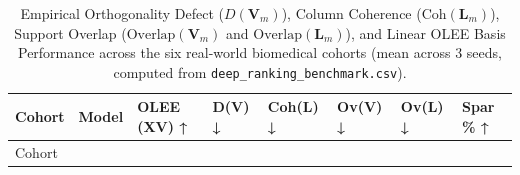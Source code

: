 \documentclass[
  10pt,
  letterpaper,
]{report}
\begin{document}
\begin{longtable}[]{@{}
  >{\raggedright\arraybackslash}p{}
  >{\raggedright\arraybackslash}p{}
  >{\raggedleft\arraybackslash}p{}
  >{\raggedleft\arraybackslash}p{}
  >{\raggedleft\arraybackslash}p{}
  >{\raggedleft\arraybackslash}p{}
  >{\raggedleft\arraybackslash}p{}
  >{\raggedleft\arraybackslash}p{}@{}}
\caption{Empirical Orthogonality Defect (\(D(\mathbf{V}_m)\)), Column
Coherence (\(\text{Coh}(\mathbf{L}_m)\)), Support Overlap
(\(\text{Overlap}(\mathbf{V}_m)\) and \(\text{Overlap}(\mathbf{L}_m)\)),
and Linear OLEE Basis Performance across the six real-world biomedical
cohorts (mean across 3 seeds, computed from
\protect\texttt{deep\_ranking\_benchmark.csv}).}\label{tbl-flow-orth-diagnostics}\tabularnewline
\toprule\noalign{}
\begin{minipage}[b]{\linewidth}\raggedright
Cohort
\end{minipage} & \begin{minipage}[b]{\linewidth}\raggedright
Model
\end{minipage} & \begin{minipage}[b]{\linewidth}\raggedleft
OLEE (XV) ↑
\end{minipage} & \begin{minipage}[b]{\linewidth}\raggedleft
D(V) ↓
\end{minipage} & \begin{minipage}[b]{\linewidth}\raggedleft
Coh(L) ↓
\end{minipage} & \begin{minipage}[b]{\linewidth}\raggedleft
Ov(V) ↓
\end{minipage} & \begin{minipage}[b]{\linewidth}\raggedleft
Ov(L) ↓
\end{minipage} & \begin{minipage}[b]{\linewidth}\raggedleft
Spar \% ↑
\end{minipage} \\
\midrule\noalign{}
\endfirsthead
\toprule\noalign{}
\begin{minipage}[b]{\linewidth}\raggedright
Cohort
\end{minipage} & \begin{minipage}[b]{\linewidth}\raggedright

\end{minipage}
\end{longtable}
\end{document}
